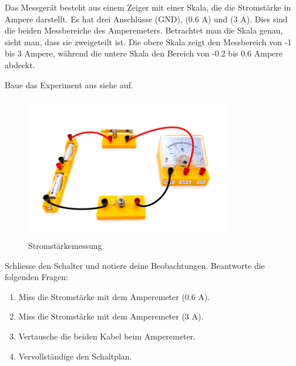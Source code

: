 Das Messgerät besteht aus einem Zeiger mit einer Skala, die die Stromstärke in Ampere darstellt.
Es hat drei Anschlüsse (GND), (0.6 A) und (3 A). Dies sind die beiden Messbereiche des Amperemeters.
Betrachtet man die Skala genau, sieht man, dass sie zweigeteilt ist. Die obere Skala zeigt
den Messbereich von -1 bis 3 Ampere, während die untere Skala den Bereich von -0.2 bis 0.6 Ampere abdeckt.


\newpage
{}


Baue das Experiment aus siehe  auf.

\begin{figure}[h!]
    \centering
    \includegraphics[width=9cm]{_images/ampere_setup.pdf}
    \caption{Stromstärkemessung}
    \label{fig:current_measurement}
\end{figure}

Schliesse den Schalter und notiere deine Beobachtungen. Beantworte die folgenden Fragen:

\begin{enumerate}
    \item Miss die Stromstärke mit dem Amperemeter (0.6 A).
    \item Miss die Stromstärke mit dem Amperemeter (3 A).
    \item Vertausche die beiden Kabel beim Amperemeter.
    \item Vervollständige den Schaltplan.
\end{enumerate}


